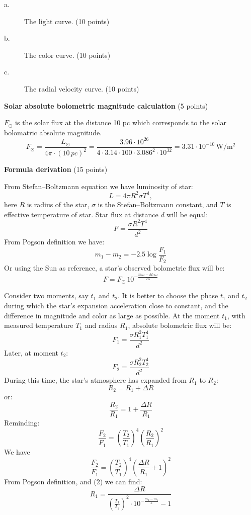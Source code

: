 \begin{description}
\item[a.] The light curve. \hfill(10 points)

\item[b.] The color curve. \hfill(10 points)

\item[c.] The radial velocity curve. \hfill(10 points)
\end{description}

\noindent\textbf{Solar absolute bolometric magnitude calculation}
\hfill(5 points)

$F_\odot$ is the solar flux at the distance 10 pc which corresponds to the
solar bolomatric absolute magnitude.
\[ F_\odot = \frac{L_\odot}{4\pi \cdot (10\,pc)^2}
   = \frac{3.96 \cdot 10^{26}}
          {4 \cdot 3.14 \cdot 100 \cdot 3.086^2 \cdot 10^{32}}
   = 3.31 \cdot 10^{-10}\,\mathrm{W/m^2} \]

\medskip
\noindent\textbf{Formula derivation} \hfill(15 points)

From Stefan--Boltzmann equation we have luminosity of star:
\[ L = 4\pi R^2 \sigma T^4, \]
here $R$ is radius of the star, $\sigma$ is the Stefan--Boltzmann constant,
and $T$ is effective temperature of star. Star flux at distance $d$ will be
equal:
\[ F = \frac{\sigma R^2 T^4}{d^2} \]
From Pogson definition we have:
\[ m_1 - m_2 = -2.5\log\frac{F_1}{F_2} \]
Or using the Sun as reference, a star's observed bolometric flux will be:
\[ F = F_\odot\,10^{-\frac{m_{bol} - M_{\odot bol}}{2.5}} \]

Consider two moments, say $t_1$ and $t_2$. It is better to choose the phase
$t_1$ and $t_2$ during which the star's expansion acceleration close to
constant, and the difference in magnitude and color as large as possible. At
the moment $t_1$, with measured temperature $T_1$ and radius $R_1$, absolute
bolometric flux will be:
\[ F_1 = \frac{\sigma R_1^2 T_1^4}{d^2}
   \tag*{(1a)} \]
Later, at moment $t_2$:
\[ F_2 = \frac{\sigma R_2^2 T_2^4}{d^2}
   \tag*{(1b)} \]
During this time, the star's atmosphere has expanded from $R_1$ to $R_2$:
\[ R_2 = R_1 + \Delta R \]
or:
\[ \frac{R_2}{R_1} = 1 + \frac{\Delta R}{R_1} \]
Reminding:
\[ \frac{F_2}{F_1}
   = \left( \frac{T_2}{T_1} \right)^4 \left( \frac{R_2}{R_1} \right)^2 \]
We have
\[ \frac{F_2}{F_1}
   = \left( \frac{T_2}{T_1} \right)^4
     \left( \frac{\Delta R}{R_1} + 1 \right)^2
   \tag*{(2)} \]
From Pogson definition, and (2) we can find:
\[ R_1 = \frac{\Delta R}
   {\left( \frac{T_1}{T_2} \right)^2 \cdot 10^{-\frac{m_2 - m_1}{5}} - 1} \]

